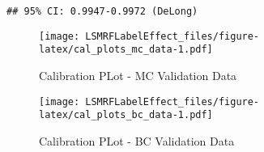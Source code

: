 \documentclass[]{article}
\begin{document}
\begin{verbatim}
## 95% CI: 0.9947-0.9972 (DeLong)
\end{verbatim}

\begin{figure}
\centering
\texttt{[image: LSMRFLabelEffect\_files/figure-latex/cal\_plots\_mc\_data-1.pdf]}
\caption{Calibration PLot - MC Validation Data}
\end{figure}

\begin{figure}
\centering
\texttt{[image: LSMRFLabelEffect\_files/figure-latex/cal\_plots\_bc\_data-1.pdf]}
\caption{Calibration PLot - BC Validation Data}
\end{figure}
\end{document}
